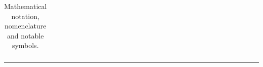 {\begin{table}[!h]
\begin{tabular}{lll}
  \end{tabular}
  \noindent\rule{\textwidth}{0.5pt}
  \caption{Mathematical notation, nomenclature and notable symbols.}
  \label{tab:mathematical_notation}
\end{table}%
}
